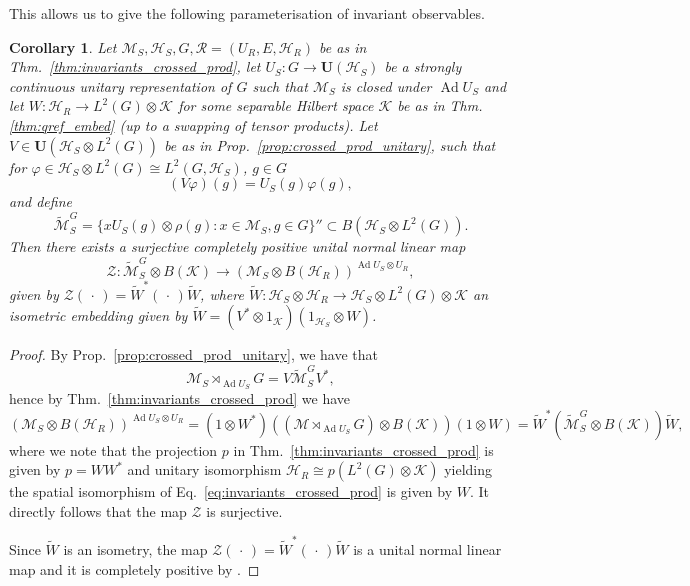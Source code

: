 \documentclass[sn-mathphys-num]{sn-jnl}%
\newcommand{\HH}{\mathcal{H}}
\newcommand{\KK}{\mathcal{K}}
\newcommand{\MM}{\mathcal{M}}
\newcommand{\zen}{%
    \mathscr{Z}
}
\DeclareMathOperator{\Ad}{Ad}
\numberwithin{equation}{section}
\theoremstyle{thmstyleone}%
\newtheorem{corollary}[theorem]{Corollary}
\theoremstyle{thmstyletwo}%
\theoremstyle{thmstylethree}%
\begin{document}
    This allows us to give the following parameterisation of invariant observables.
    \begin{corollary}
    \label{cor:inv_unitary_param}
        Let $\MM_S,\HH_S,G,\mathcal{R}=(U_R,E,\HH_R)$ be as in Thm.\ \ref{thm:invariants_crossed_prod}, let $U_S:G\to \mathbf{U}(\HH_S)$ be a strongly continuous unitary representation of $G$ such that $\MM_S$ is closed under $\Ad U_S$ and let $W:\HH_R\to L^2(G)\otimes\KK$ for some separable Hilbert space $\KK$ be as in Thm. \ref{thm:qref_embed} (up to a swapping of tensor products). Let $V\in \mathbf{U}(\HH_S\otimes L^2(G))$ be as in Prop.\ \ref{prop:crossed_prod_unitary}, such that for $\varphi\in \HH_S\otimes L^2(G)\cong L^2(G,\HH_S)$, $g\in G$
        \begin{equation}
            (V\varphi)(g)=U_S(g)\varphi(g),
        \end{equation}
        and define
        \begin{equation}
            \tilde{\MM}_S^G=\{xU_S(g)\otimes\rho(g):x\in \MM_S,g\in G\}''\subset B(\HH_S\otimes L^2(G)).
        \end{equation}
        Then there exists a surjective completely positive unital normal linear map 
        \begin{equation}
            \zen:\tilde{\MM}_S^G\otimes B(\KK)\to (\MM_S\otimes B(\HH_R))^{\Ad U_S\otimes U_R},
        \end{equation}
        given by $\zen(\,\cdot\,)=\tilde{W}^*(\,\cdot\,)\tilde{W}$, where $\tilde{W}:\HH_S\otimes\HH_R\to \HH_S\otimes L^2(G)\otimes\KK$ an isometric embedding given by $\tilde{W}=(V^*\otimes 1_\KK)(1_{\HH_S}\otimes W)$.
    \end{corollary}
    \begin{proof}
        By Prop.\ \ref{prop:crossed_prod_unitary}, we have that 
        \begin{equation}
            \MM_S\rtimes_{\Ad U_S} G= V\tilde{\MM}_S^GV^*,
        \end{equation}
        hence by Thm.\ \ref{thm:invariants_crossed_prod} we have
        \begin{equation}
            (\MM_S\otimes B(\HH_R))^{\Ad U_S\otimes U_R}=(1\otimes W^*)((\MM\rtimes_{\Ad U_S} G)\otimes B(\KK))(1\otimes W)= \tilde{W}^*(\tilde{\MM}_S^G\otimes B(\KK))\tilde{W},
        \end{equation}
        where we note that the projection $p$ in Thm.\ \ref{thm:invariants_crossed_prod} is given by $p=WW^*$ and unitary isomorphism $\HH_R\cong p(L^2(G)\otimes \KK)$ yielding the spatial isomorphism of Eq.\ \eqref{eq:invariants_crossed_prod} is given by $W$. It directly follows that the map $\zen$ is surjective.
        
        Since $\tilde{W}$ is an isometry, the map $\zen(\,\cdot\,)=\tilde{W}^*(\,\cdot\,)\tilde{W}$ is a unital normal linear map and it is completely positive by \cite[Thm.\ IV.3.6]{Takesaki2001}. 
    \end{proof}
\end{document}
